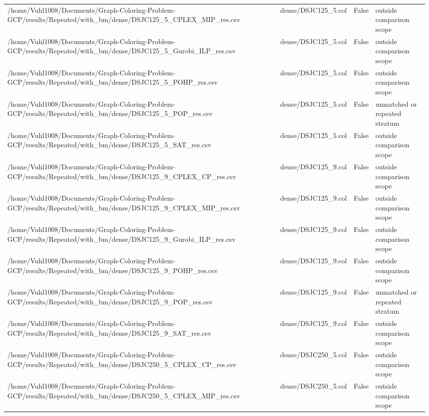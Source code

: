 \begin{table}[htbp]
\begin{tabular}{llll}
/home/Vuhl1008/Documents/Graph-Coloring-Problem-GCP/results/Repeated/with\_bm/dense/DSJC125\_5\_CPLEX\_MIP\_res.csv & dense/DSJC125\_5.col & False & outside comparison scope \\
/home/Vuhl1008/Documents/Graph-Coloring-Problem-GCP/results/Repeated/with\_bm/dense/DSJC125\_5\_Gurobi\_ILP\_res.csv & dense/DSJC125\_5.col & False & outside comparison scope \\
/home/Vuhl1008/Documents/Graph-Coloring-Problem-GCP/results/Repeated/with\_bm/dense/DSJC125\_5\_POHP\_res.csv & dense/DSJC125\_5.col & False & outside comparison scope \\
/home/Vuhl1008/Documents/Graph-Coloring-Problem-GCP/results/Repeated/with\_bm/dense/DSJC125\_5\_POP\_res.csv & dense/DSJC125\_5.col & False & unmatched or repeated stratum \\
/home/Vuhl1008/Documents/Graph-Coloring-Problem-GCP/results/Repeated/with\_bm/dense/DSJC125\_5\_SAT\_res.csv & dense/DSJC125\_5.col & False & outside comparison scope \\
/home/Vuhl1008/Documents/Graph-Coloring-Problem-GCP/results/Repeated/with\_bm/dense/DSJC125\_9\_CPLEX\_CP\_res.csv & dense/DSJC125\_9.col & False & outside comparison scope \\
/home/Vuhl1008/Documents/Graph-Coloring-Problem-GCP/results/Repeated/with\_bm/dense/DSJC125\_9\_CPLEX\_MIP\_res.csv & dense/DSJC125\_9.col & False & outside comparison scope \\
/home/Vuhl1008/Documents/Graph-Coloring-Problem-GCP/results/Repeated/with\_bm/dense/DSJC125\_9\_Gurobi\_ILP\_res.csv & dense/DSJC125\_9.col & False & outside comparison scope \\
/home/Vuhl1008/Documents/Graph-Coloring-Problem-GCP/results/Repeated/with\_bm/dense/DSJC125\_9\_POHP\_res.csv & dense/DSJC125\_9.col & False & outside comparison scope \\
/home/Vuhl1008/Documents/Graph-Coloring-Problem-GCP/results/Repeated/with\_bm/dense/DSJC125\_9\_POP\_res.csv & dense/DSJC125\_9.col & False & unmatched or repeated stratum \\
/home/Vuhl1008/Documents/Graph-Coloring-Problem-GCP/results/Repeated/with\_bm/dense/DSJC125\_9\_SAT\_res.csv & dense/DSJC125\_9.col & False & outside comparison scope \\
/home/Vuhl1008/Documents/Graph-Coloring-Problem-GCP/results/Repeated/with\_bm/dense/DSJC250\_5\_CPLEX\_CP\_res.csv & dense/DSJC250\_5.col & False & outside comparison scope \\
/home/Vuhl1008/Documents/Graph-Coloring-Problem-GCP/results/Repeated/with\_bm/dense/DSJC250\_5\_CPLEX\_MIP\_res.csv & dense/DSJC250\_5.col & False & outside comparison scope \\

\end{tabular}
\end{table}
